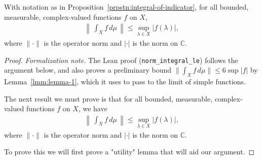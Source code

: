 \begin{proposition}
    \label{prpstn:integral-norm-bound}
    \leanok
    With notation as in Proposition~\ref{prpstn:integral-of-indicator}, for all bounded, measurable, complex-valued functions $f$ on $X$,
    \begin{align}
        \left\| \, \int_X f \, d\mu \, \right\| \le \sup\limits_{\lambda \in X} \left\lvert f(\lambda) \right\rvert,
    \end{align}
    where $\| \cdot \|$ is the operator norm and $\lvert \cdot \rvert$ is the norm on $\mathbb{C}$.
\end{proposition}
\begin{proof}
    \leanok
\noindent\textit{Formalization note.} The Lean proof (\texttt{norm\_integral\_le}) follows the argument below, and also proves a preliminary bound $\|\int_X f\,d\mu\| \le 6\sup|f|$ by Lemma~\ref{lmm:lemma-1}, which it uses to pass to the limit of simple functions.

The next result we must prove is that for all bounded, measurable, complex-valued functions $f$ on $X$, we have
\begin{align}
    \left\| \, \int_X f \, d\mu \, \right\| \le \sup\limits_{\lambda \in X} \left\lvert f(\lambda) \right\rvert,
\end{align}
where $\| \cdot \|$ is the operator norm and $\lvert \cdot \rvert$ is the norm on $\mathbb{C}$.

To prove this we will first prove a "utility" lemma that will aid our argument.


\end{proof}
